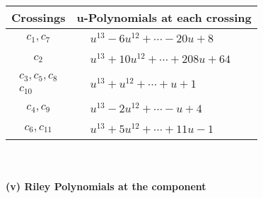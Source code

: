 \documentclass[1p]{elsarticle_modified}
\theoremstyle{definition}
\begin{document}
\begin{tabular}{m{50pt}|m{274pt}}
Crossings & \hspace{64pt}u-Polynomials at each crossing \\
\hline $$\begin{aligned}c_{1},c_{7}\end{aligned}$$&$\begin{aligned}
&u^{13}-6 u^{12}+\cdots-20 u+8
\end{aligned}$\\
\hline $$\begin{aligned}c_{2}\end{aligned}$$&$\begin{aligned}
&u^{13}+10 u^{12}+\cdots+208 u+64
\end{aligned}$\\
\hline $$\begin{aligned}c_{3},c_{5},c_{8}\\c_{10}\end{aligned}$$&$\begin{aligned}
&u^{13}+u^{12}+\cdots+u+1
\end{aligned}$\\
\hline $$\begin{aligned}c_{4},c_{9}\end{aligned}$$&$\begin{aligned}
&u^{13}-2 u^{12}+\cdots- u+4
\end{aligned}$\\
\hline $$\begin{aligned}c_{6},c_{11}\end{aligned}$$&$\begin{aligned}
&u^{13}+5 u^{12}+\cdots+11 u-1
\end{aligned}$\\
\hline
\end{tabular}\\~\\
\newpage\renewcommand{\arraystretch}{1}
\flushleft \textbf{(v) Riley Polynomials at the component}\newline \\
\end{document}
